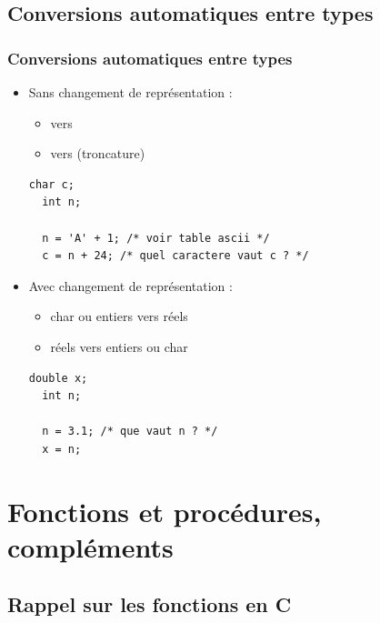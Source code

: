 \documentclass[xcolor=pdftex,svgnames,table]{beamer}
\begin{document}
\subsection[Conversions automatiques]{Conversions automatiques entre types}
\begin{frame}[fragile]
  \frametitle{Conversions  automatiques entre types}

  \begin{itemize}
\item Sans changement de représentation  :
  \begin{itemize}
    \item {} vers 
    \item {} vers  (troncature)
  \end{itemize}\pause
  \begin{lstlisting}[basicstyle=\ttfamily\small] 
  char c;
  int n;
  
  n = 'A' + 1; /* voir table ascii */
  c = n + 24; /* quel caractere vaut c ? */
   \end{lstlisting}  
 \item Avec changement de représentation :
    \begin{itemize}
    \item char ou entiers vers réels
    \item réels vers entiers ou char
    \end{itemize}
  \begin{lstlisting}[basicstyle=\ttfamily\small] 
  double x;
  int n;
  
  n = 3.1; /* que vaut n ? */
  x = n; 
   \end{lstlisting} 
  \end{itemize}
\end{frame}

\section{Fonctions et procédures, compléments}

\subsection{Rappel sur les fonctions en C}
\end{document}
